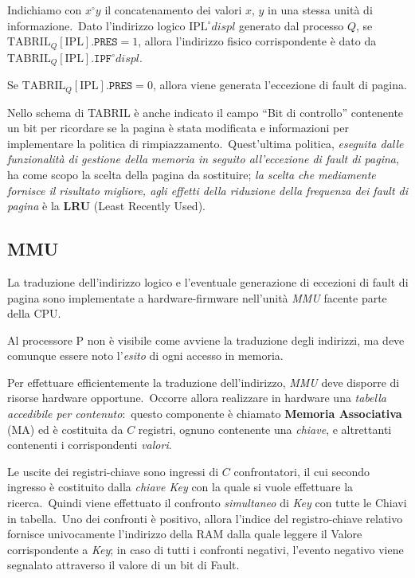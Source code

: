 \noindent Indichiamo con $x^{\circ} y$ il concatenamento dei valori $x$, $y$ in una stessa unità di informazione.\
Dato l'indirizzo logico $\mathrm{IPL}^{\circ}\mathit{displ}$ generato dal processo $Q$, se $\mathrm{TABRIL}_Q[\mathrm{IPL}].\mathtt{PRES} =1$, allora l'indirizzo fisico corrispondente è dato da $\mathrm{TABRIL}_Q[\mathrm{IPL}].\mathtt{IPF}^{\circ}\mathit{displ}$.

Se $\mathrm{TABRIL}_Q[\mathrm{IPL}].\mathtt{PRES} = 0$, allora viene generata l'eccezione di fault di pagina.

Nello schema di TABRIL è anche indicato il campo ``Bit di controllo'' contenente un bit per ricordare se la pagina è stata modificata e informazioni per implementare la politica di rimpiazzamento.\
Quest'ultima politica, \textit{eseguita dalle funzionalità di gestione della memoria in seguito all'eccezione di fault di pagina}, ha come scopo la scelta della pagina da sostituire; \textit{la scelta che mediamente fornisce il risultato migliore, agli effetti della riduzione della frequenza dei fault di pagina} è la \textbf{LRU} (Least Recently Used).

\subsection{MMU}

La traduzione dell'indirizzo logico e l'eventuale generazione di eccezioni di fault di pagina sono implementate a hardware-firmware nell'unità \textit{MMU} facente parte della CPU.

Al processore P non è visibile come avviene la traduzione degli indirizzi, ma deve comunque essere noto l'\textit{esito} di ogni accesso in memoria.

Per effettuare efficientemente la traduzione dell'indirizzo, \textit{MMU} deve disporre di risorse hardware opportune.\
Occorre allora realizzare in hardware una \textit{tabella accedibile per contenuto}:\ questo componente è chiamato \textbf{Memoria Associativa} (MA) ed è costituita da $C$ registri, ognuno contenente una \textit{chiave}, e altrettanti contenenti i corrispondenti \textit{valori}.

Le uscite dei registri-chiave sono ingressi di $C$ confrontatori, il cui secondo ingresso è costituito dalla \textit{chiave Key} con la quale si vuole effettuare la ricerca.\
Quindi viene effettuato il confronto \textit{simultaneo} di \textit{Key} con tutte le Chiavi in tabella.\
Uno dei confronti è positivo, allora l'indice del registro-chiave relativo fornisce univocamente l'indirizzo della RAM dalla quale leggere il Valore corrispondente a \textit{Key}; in caso di tutti i confronti negativi, l'evento negativo viene segnalato attraverso il valore di un bit di Fault.

